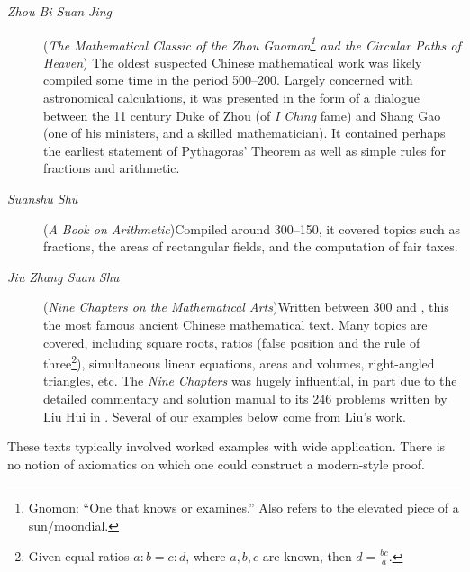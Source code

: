 \goodbreak



\begin{description}
	\item[\normalfont\emph{Zhou Bi Suan Jing}] (\emph{The Mathematical Classic of the Zhou Gnomon\footnote{Gnomon: ``One that knows or examines.'' Also refers to the elevated piece of a sun/moondial.} and the Circular Paths of Heaven})\newline
The oldest suspected Chinese mathematical work was likely compiled some time in the period 500--200\BC. Largely concerned with astronomical calculations, it was presented in the form of a dialogue between the 11\th{} century Duke of Zhou (of \emph{I Ching} fame) %
and Shang Gao (one of his ministers, and a skilled mathematician). It contained perhaps the earliest statement of Pythagoras' Theorem as well as simple rules for fractions and arithmetic.

	\item[\normalfont \emph{Suanshu Shu}] (\emph{A Book on Arithmetic})\lstsp Compiled around 300--150\BC, it covered topics such as fractions, the areas of rectangular fields, and the computation of fair taxes.

	\item[\normalfont \emph{Jiu Zhang Suan Shu}] (\emph{Nine Chapters on the Mathematical Arts})\lstsp Written between 300\BC{} and , this the most famous ancient Chinese mathematical text. Many topics are covered, including square roots, ratios (false position and the rule of three\footnote{Given equal ratios $a:b=c:d$, where $a,b,c$ are known, then $d=\frac{bc}a$.}), simultaneous linear equations, areas and volumes, right-angled triangles, etc. The \emph{Nine Chapters} was hugely influential, in part due to the detailed commentary and solution manual to its 246 problems written by Liu Hui in . Several of our examples below come from Liu's work. 
\end{description}

These texts typically involved worked examples with wide application. There is no notion of axiomatics on which one could construct a modern-style proof.



